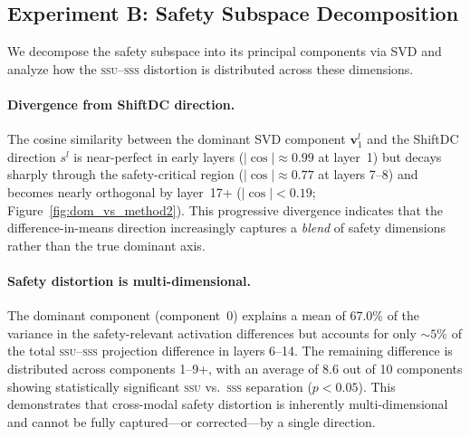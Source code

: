 \documentclass{article}
\newcommand{\ssu}{\textsc{ssu}}
\newcommand{\sss}{\textsc{sss}}
\begin{document}
\subsection{Experiment B: Safety Subspace Decomposition}
\label{sec:exp_b}

We decompose the safety subspace into its principal components via SVD and
analyze how the \ssu--\sss{} distortion is distributed across these dimensions.

\paragraph{Divergence from ShiftDC direction.}
The cosine similarity between the dominant SVD component $\mathbf{v}_1^l$ and
the ShiftDC direction $s^l$ is near-perfect in early layers ($|\cos| \approx 0.99$
at layer~1) but decays sharply through the safety-critical region ($|\cos| \approx
0.77$ at layers 7--8) and becomes nearly orthogonal by layer~17+
($|\cos| < 0.19$; Figure~\ref{fig:dom_vs_method2}).  This progressive divergence
indicates that the difference-in-means direction increasingly captures a
\emph{blend} of safety dimensions rather than the true dominant axis.

\paragraph{Safety distortion is multi-dimensional.}
The dominant component (component~0) explains a mean of 67.0\% of the variance
in the safety-relevant activation differences but accounts for only ${\sim}5\%$
of the total \ssu--\sss{} projection difference in layers 6--14.  The remaining
difference is distributed across components 1--9+, with an average of 8.6 out
of 10 components showing statistically significant \ssu{} vs.\ \sss{} separation
($p < 0.05$).  This demonstrates that cross-modal safety distortion is
inherently multi-dimensional and cannot be fully captured---or corrected---by a
single direction.
\end{document}
